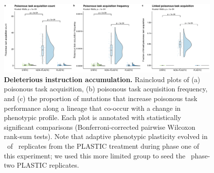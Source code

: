 \begin{figure}[ht!]
    \centering
    \includegraphics[width=1.0\textwidth]{media-poison-accumulation-panel.pdf}
    \caption{\small
    \textbf{Deleterious instruction accumulation.}
    Raincloud plots of
    (a) poisonous task acquisition,
    (b) poisonous task acquisition frequency,
    and (c) the proportion of mutations that increase poisonous task performance along a lineage that co-occur with a change in phenotypic profile.
    Each plot is annotated with statistically significant comparisons (Bonferroni-corrected pairwise Wilcoxon rank-sum tests).
    Note that adaptive phenotypic plasticity evolved in \deleteriousHitchhikingPlasticReps\ of \deleteriousHitchhikingReplicates\ replicates from the PLASTIC treatment during phase one of this experiment; we used this more limited group to seed the \deleteriousHitchhikingPlasticReps\ phase-two PLASTIC replicates.
    }
    \label{fig:deleterious-hitchhiking}
\end{figure}